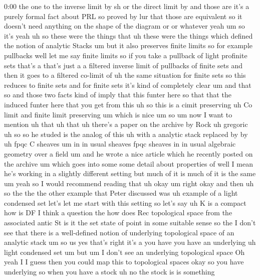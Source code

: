 \begin{unfinished}{0:00}
the  one  to  the  inverse  limit  by  sh  or
the  direct  limit  by  and  those  are  it's  a
purely  formal  fact  about  PRL  so  proved
by  lur  that  those  are  equivalent  so  it
doesn't  need  anything  on  the  shape  of
the  diagram  or  or  whatever  yeah  um  so
it's  yeah  uh  so  these  were  the  things
that  uh  these  were  the  things  which
defined  the  notion  of  analytic
Stacks  um  but  it  also
preserves  finite  limits  so  for  example
pullbacks  well  let  me  say  finite
limits  so  if  you  take
a  pullback  of  light  profinite  sets
that's  a  that's  just  a  a  filtered
inverse  limit  of  pullbacks  of  finite
sets  and  then  it  goes  to  a  filtered
co-limit
of  uh  the  same  situation  for  finite  sets
so  this  reduces  to  finite  sets  and  for
finite  sets  it's  kind  of  completely
clear  um  and  that  so  and  those  two  facts
kind  of  imply  that  this  funter  here  so
that  that  the  induced  funter  here  that
you  get  from  this  uh  so  this  is  a  cimit
preserving  uh  Co  limit  and  finite  limit
preserving  um  which  is
nice
um  so  um  now  I  want  to  mention  uh  that
uh  that  uh  there's  a  paper  on  the
archive  by  Rock  uh  gregoric  uh  so  so  he
studed  is  the  analog  of
this  uh  with  a  analytic
stack  replaced
by  by  uh  fpqc  C
sheaves  um  in  in  usual  sheaves  fpqc
sheaves  in  in  usual  algebraic
geometry  over  a  field  um  and  he  wrote  a
nice  article  which  he  recently  posted  on
the  archive  um  which  goes  into  some  some
detail  about  properties  of  well  I  mean
he's  working  in  a  slightly  different
setting  but  much  of  it  is  much  of  it  is
the  same
um  yeah  so  I  would  recommend  reading
that
uh  okay  um  right  okay  and  then  uh  so  the
the  the  other  example  that  Peter
discussed  was  uh  example  of  a  light
condensed  set  let's  let  me  start  with
this  setting  so  let's  say  uh  K  is  a
compact
how  is
DF  I  think  a  question
the  how  does  Rec  topological  space  from
the  associated  antic  St  is  it  the  set
state  of  point  in  some  suitable
sense  so
the  I  don't  see  that  there  is  a
well-defined  notion  of  underlying
topological  space  of  an  analytic  stack
um  so  us
yes  that's  right  it's  a  you  have  you
have  an  underlying  uh  light  condensed
set
um  but  um  I  don't  see  an  underlying
topological  space  Oh  yeah  I  I  guess  then
you  could  map  this  to  topological  spaces
okay  so  you  have
underlying  so  when  you  have  a
stock  uh  no  the  stock  is  is  something

\end{unfinished}
